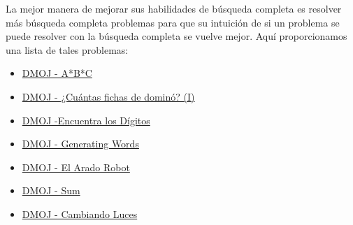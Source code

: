La mejor manera de mejorar sus habilidades de búsqueda completa es resolver más búsqueda completa
problemas para que su intuición de si un problema se puede resolver con la búsqueda completa se vuelve
mejor. Aquí  proporcionamos una lista de tales problemas:

\begin{itemize}
	\item \href{https://dmoj.uclv.edu.cu/problem/abc}{DMOJ - A*B*C}
	\item \href{https://dmoj.uclv.edu.cu/problem/dominoes1}{DMOJ - ¿Cuántas fichas de dominó? (I)}
	\item \href{https://dmoj.uclv.edu.cu/problem/finddigits}{DMOJ -Encuentra los Dígitos}
	\item \href{https://dmoj.uclv.edu.cu/problem/genword}{DMOJ - Generating Words}
	\item \href{https://dmoj.uclv.edu.cu/problem/rplow}{DMOJ - El Arado Robot}
	\item \href{https://dmoj.uclv.edu.cu/problem/sum}{DMOJ - Sum}
	\item \href{https://dmoj.uclv.edu.cu/problem/swtch}{DMOJ - Cambiando Luces}
\end{itemize}